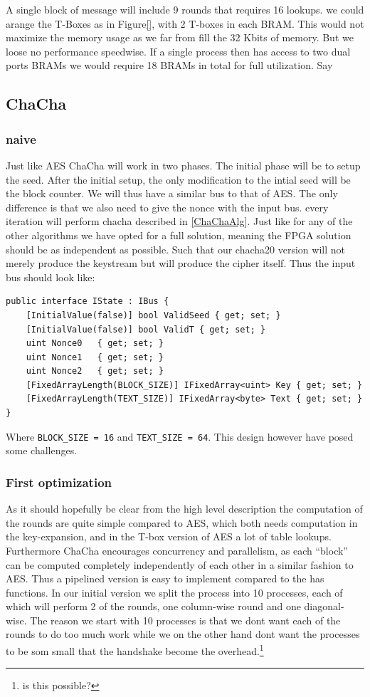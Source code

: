 \documentclass[a4paper]{article}
\begin{document}
A single block of message will include 9 rounds that requires 16 lookups. we could arange the T-Boxes as in Figure\ref{}, with 2 T-boxes in each BRAM. This would not maximize the memory usage as we far from fill the 32 Kbits of memory. But we loose no performance speedwise. If a single process then has access to two dual ports BRAMs we would require 18 BRAMs in total for full utilization. Say
\subsection{ChaCha}
\label{sec:orgccb22f3}

\subsubsection{naive}
\label{ChaChaNaive}
Just like AES ChaCha will work in two phases. The initial phase will be to setup the seed. After the initial setup, the only modification to the intial seed will be the block counter. We will thus have a similar bus to that of AES. The only difference is that we also need to give the nonce with the input bus. every iteration will perform chacha described in \ref{ChaChaAlg}. Just like for any of the other algorithms we have opted for a full solution, meaning the FPGA solution should be as independent as possible. Such that our chacha20 version will not merely produce the keystream but will produce the cipher itself. Thus the input bus should look like:
\begin{verbatim}
public interface IState : IBus {
    [InitialValue(false)] bool ValidSeed { get; set; }
    [InitialValue(false)] bool ValidT { get; set; }
    uint Nonce0   { get; set; }
    uint Nonce1   { get; set; }
    uint Nonce2   { get; set; }
    [FixedArrayLength(BLOCK_SIZE)] IFixedArray<uint> Key { get; set; }
    [FixedArrayLength(TEXT_SIZE)] IFixedArray<byte> Text { get; set; }
}
\end{verbatim}
Where \texttt{BLOCK\_SIZE = 16} and \texttt{TEXT\_SIZE = 64}. This design however have posed some challenges.
\subsubsection{First optimization}
\label{ChaCha1}
As it should hopefully be clear from the high level description the computation of the rounds are quite simple compared to AES, which both needs computation in the key-expansion, and in the T-box version of AES a lot of table lookups. Furthermore ChaCha encourages concurrency and parallelism, as each ``block'' can be computed completely independently of each other in a similar fashion to AES. Thus a pipelined version is easy to implement compared to the has functions. In our initial version we split the process into 10 processes, each of which will perform 2 of the rounds, one column-wise round and one diagonal-wise. The reason we start with 10 processes is that we dont want each of the rounds to do too much work while we on the other hand dont want the processes to be som small that the handshake become the overhead.\footnote{is this possible?}
\end{document}
